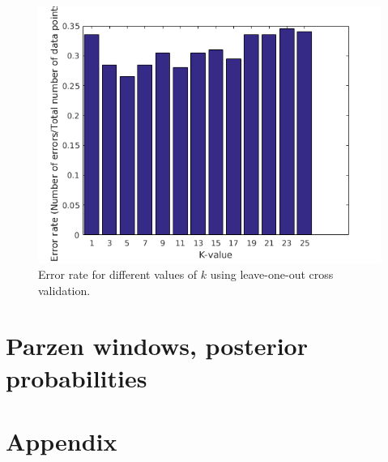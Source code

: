 \documentclass[10pt]{article}
\begin{document}
\begin{figure}[H]
 \centering
 \includegraphics[width=.7\textwidth]{assign2_4_b.png}
 \caption{Error rate for different values of $k$ using leave-one-out cross validation.}
 \label{fig2.4_b}
\end{figure}

\section{Parzen windows, posterior probabilities}
\subsection{}


\section*{Appendix}




\end{document}
